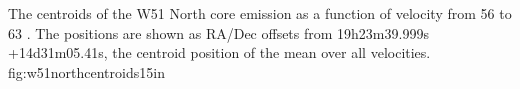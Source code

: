 
{The centroids of the W51 North core \ortho \twotwo emission as a function of 
velocity from 56 to 63 \kms.  The positions are shown as RA/Dec offsets from
19h23m39.999s +14d31m05.41s, the centroid position of the mean over all
velocities.}
{fig:w51northcentroids}{1}{5in}

% 
% 


